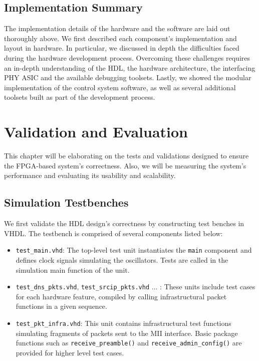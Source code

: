 \documentclass[a4paper]{report}
\newcommand{\proglang}{\textsf}
\newcommand{\code}{\texttt}
\begin{document}
\section{Implementation Summary}

The implementation details of the hardware and the software are laid out thoroughly above. We first described each component's implementation and layout in hardware. In particular, we discussed in depth the difficulties faced during the hardware development process. Overcoming these challenges requires an in-depth understanding of the HDL, the hardware architecture, the interfacing PHY ASIC and the available debugging toolsets. Lastly, we showed the modular implementation of the control system software, as well as several additional toolsets built as part of the development process.

\chapter{Validation and Evaluation}

This chapter will be elaborating on the tests and validations designed to ensure the FPGA-based system's correctness. Also, we will be measuring the system's performance and evaluating its usability and scalability. 

\section{Simulation Testbenches}
\label{section:validation-simulation}

We first validate the HDL design's correctness by constructing test benches in \proglang{VHDL}. The testbench is comprised of several components listed below:

\begin{itemize}
    \item \code{test\_main.vhd}: The top-level test unit instantiates the \code{main} component and defines clock signals simulating the oscillators. Tests are called in the simulation main function of the unit.
    \item \code{test\_dns\_pkts.vhd}, \code{test\_srcip\_pkts.vhd} ... : These units include test cases for each hardware feature, compiled by calling infrastructural packet functions in a given sequence. 
    \item \code{test\_pkt\_infra.vhd}: This unit contains infrastructural test functions simulating fragments of packets sent to the MII interface. Basic package functions such as \code{receive\_preamble()} and \code{receive\_admin\_config()} are provided for higher level test cases.
\end{itemize}
\end{document}
